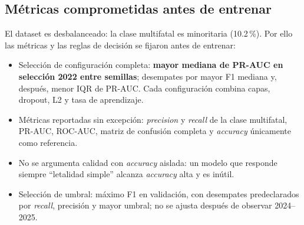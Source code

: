 \subsection{Métricas comprometidas antes de entrenar}
El dataset es desbalanceado: la clase multifatal es minoritaria (10.2\,\%). Por ello las métricas y las reglas de decisión se fijaron antes de entrenar:
\begin{itemize}
  \item Selección de configuración completa: \textbf{mayor mediana de PR-AUC en selección 2022 entre semillas}; desempates por mayor F1 mediana y, después, menor IQR de PR-AUC. Cada configuración combina capas, dropout, L2 y tasa de aprendizaje.
  \item Métricas reportadas sin excepción: \emph{precision} y \emph{recall} de la clase multifatal, PR-AUC, ROC-AUC, matriz de confusión completa y \emph{accuracy} únicamente como referencia.
  \item No se argumenta calidad con \emph{accuracy} aislada: un modelo que responde siempre ``letalidad simple'' alcanza \emph{accuracy} alta y es inútil.
  \item Selección de umbral: máximo F1 en validación, con desempates predeclarados por \emph{recall}, precisión y mayor umbral; no se ajusta después de observar 2024--2025.
\end{itemize}
